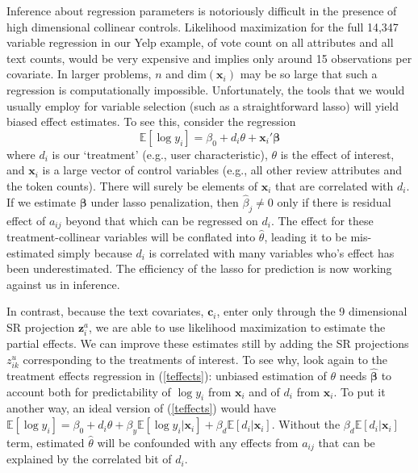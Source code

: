 \documentclass[12pt]{article}
\newcommand{\bs}[1]{\boldsymbol{#1}}
\newcommand{\mr}[1]{\mathrm{#1}}
\newcommand{\bm}[1]{\mathbf{#1}}
\newcommand{\ds}[1]{\mathds{#1}}
\begin{document}
Inference about regression parameters is notoriously difficult in the presence of high dimensional collinear controls.  Likelihood maximization for the full 14,347
variable regression in our Yelp example, of vote count on all attributes and all text counts,  would be very expensive and implies only around 15 observations per covariate.  
In larger problems, $n$ and $\mr{dim}(\bm{x}_i)$ may be so large that such a regression is computationally impossible.
Unfortunately, the tools that we would usually employ for variable selection (such as a straightforward lasso) will yield biased effect estimates.  To see this, consider
the regression 
\begin{equation}\label{teffects}
\ds{E}[\log y_i] = \beta_0 + d_i\theta  + \bm{x}_i'\bs{\beta}
\end{equation}
where $d_i$ is our `treatment' (e.g., user characteristic), $\theta$ is
the effect of interest, and $\bm{x}_i$ is a large vector of control
variables (e.g., all other review attributes and the token counts).   There
will surely be elements of $\bm{x}_i$ that are correlated with $d_i$. If
we estimate $\bs{\beta}$ under lasso penalization, 
then $\hat\beta_j \neq 0$ only if there is 
residual effect of $a_{ij}$ beyond that which can be regressed on $d_i$.  The
 effect for these treatment-collinear variables will be conflated
into $\hat\theta$, leading it to be mis-estimated simply because $d_i$ is correlated with many
variables who's effect has been underestimated.  The efficiency of the lasso
for prediction is now working against us in inference.

In contrast, because the text covariates, $\bm{c}_i$, enter only through the 9
dimensional SR projection $\bm{z}^a_i$, we are able to use likelihood maximization
 to estimate the partial effects.
We can improve these estimates still by adding the SR
projections $z^u_{ik}$ corresponding to the treatments of interest.    To see why, look
again to the treatment effects regression in (\ref{teffects}): 
unbiased estimation of $\theta$ needs $\bs{\hat\beta}$ to account both for
predictability of $\log y_i$ from $\bm{x}_i$ and of $d_i$ from $\bm{x}_i$.  To
put it another way, an ideal version of (\ref{teffects}) would have $\ds{E}[\log y_i] = \beta_0 + d_i\theta  + \beta_y \ds{E}[\log y_i
| \bm{x}_i] + \beta_d \ds{E}[d_i | \bm{x}_i]$.  Without the $\beta_d \ds{E}[d_i | \bm{x}_i]$ 
term, estimated $\hat\theta$ will be confounded with any effects from
$a_{ij}$ that can be explained by the correlated bit of $d_i$. 
\end{document}
